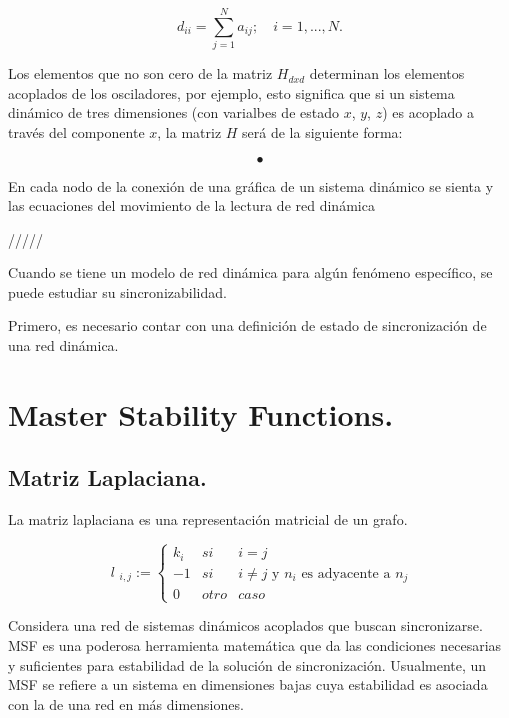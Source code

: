 \documentclass{llncs}
\theoremstyle{plane}
\begin{document}
\begin{equation}
d_{ii}= \sum_{j=1}^{N}a_{ij} ; \quad i = 1,...,N.
\end{equation}

Los elementos que no son cero de la matriz $H_{dxd}$ determinan los elementos acoplados de los osciladores, por ejemplo, esto significa que si un sistema dinámico de tres dimensiones (con varialbes de estado $x$, $y$, $z$) es acoplado a través del componente  $x$, la matriz $H$ será de la siguiente forma:

\begin{equation}
•
\end{equation}



En cada nodo de
la conexión de una gráfica de un sistema dinámico se sienta y las ecuaciones del movimiento de la
lectura de red dinámica

/////

Cuando se tiene un modelo de red dinámica para algún fenómeno específico, se puede estudiar su sincronizabilidad.

Primero, es necesario contar con una definición de estado de sincronización de una red dinámica. 


\section{Master Stability Functions.}

\subsection{Matriz Laplaciana.}
La matriz laplaciana es una representación matricial de un grafo.

\begin{equation}
 \textit{ l } _{i,j} := 
   \left \{
      \begin{array}{rcl}
          k_{i} & si  & i = j \\
            -1 & si & i \neq j  \text{ y }    n_{i}  \text{ es  adyacente  a }  n_{j} \\ 
         0 & otro & caso
      \end{array}
   \right.
\end{equation} 



Considera una red de sistemas dinámicos acoplados que buscan sincronizarse. MSF es una poderosa herramienta matemática que da las condiciones necesarias y suficientes para estabilidad de la solución de sincronización. Usualmente, un MSF se refiere a un sistema en dimensiones bajas cuya estabilidad es asociada con la de una red en más dimensiones. 
\end{document}
